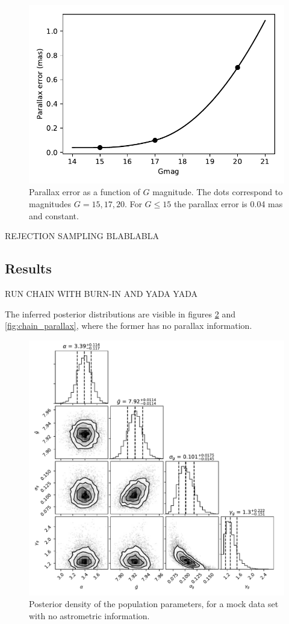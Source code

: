 \documentclass[fleqn,usenatbib]{mnras}
\begin{document}
\begin{figure}
	\includegraphics[width=\columnwidth]{parallax_error.pdf}
    \caption{Parallax error as a function of $G$ magnitude. The dots correspond to magnitudes $G=15,17,20$. For $G\leq 15$ the parallax error is 0.04 mas and constant.}
    \label{fig:parallax_error}
\end{figure}

REJECTION SAMPLING BLABLABLA


\subsection{Results}

RUN CHAIN WITH BURN-IN AND YADA YADA

The inferred posterior distributions are visible in figures \ref{fig:chain} and \ref{fig:chain_parallax}, where the former has no parallax information.

\begin{figure}
	\includegraphics[width=.8\textwidth]{toy_chain_40-40.pdf}
    \caption{Posterior density of the population parameters, for a mock data set with no astrometric information.}
    \label{fig:chain}
\end{figure}
\end{document}
